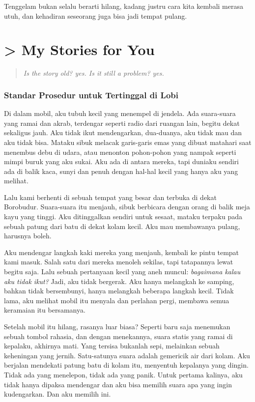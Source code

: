 \documentclass[
  letterpaper,
  DIV=11,
  numbers=noendperiod]{scrreprt}
\begin{document}
Tenggelam bukan selalu berarti hilang, kadang justru cara kita kembali
merasa utuh, dan kehadiran seseorang juga bisa jadi tempat pulang.


\chapter{\textgreater{} My Stories for You}\label{my-stories-for-you}

\begin{quote}
\emph{Is the story old? yes. Is it still a problem? yes.}
\end{quote}

\subsection{\texorpdfstring{\textbf{Standar Prosedur untuk Tertinggal di
Lobi}}{Standar Prosedur untuk Tertinggal di Lobi}}\label{standar-prosedur-untuk-tertinggal-di-lobi}

Di dalam mobil, aku tubuh kecil yang menempel di jendela. Ada
suara-suara yang ramai dan akrab, terdengar seperti radio dari ruangan
lain, begitu dekat sekaligus jauh. Aku tidak ikut mendengarkan,
dua-duanya, aku tidak mau dan aku tidak bisa. Mataku sibuk melacak
garis-garis emas yang dibuat matahari saat menembus debu di udara, atau
menonton pohon-pohon yang nampak seperti mimpi buruk yang aku sukai. Aku
ada di antara mereka, tapi duniaku sendiri ada di balik kaca, sunyi dan
penuh dengan hal-hal kecil yang hanya aku yang melihat.

Lalu kami berhenti di sebuah tempat yang besar dan terbuka di dekat
Borobudur. Suara-suara itu menjauh, sibuk berbicara dengan orang di
balik meja kayu yang tinggi. Aku ditinggalkan sendiri untuk sesaat,
mataku terpaku pada sebuah patung dari batu di dekat kolam kecil. Aku
mau membawanya pulang, harusnya boleh.

Aku mendengar langkah kaki mereka yang menjauh, kembali ke pintu tempat
kami masuk. Salah satu dari mereka menoleh sekilas, tapi tatapannya
lewat begitu saja. Lalu sebuah pertanyaan kecil yang aneh muncul:
\emph{bagaimana kalau aku tidak ikut?} Jadi, aku tidak bergerak. Aku
hanya melangkah ke samping, bahkan tidak bersembunyi, hanya melangkah
beberapa langkah kecil. Tidak lama, aku melihat mobil itu menyala dan
perlahan pergi, membawa semua keramaian itu bersamanya.

Setelah mobil itu hilang, rasanya luar biasa? Seperti baru saja
menemukan sebuah tombol rahasia, dan dengan menekannya, suara statis
yang ramai di kepalaku, akhirnya mati. Yang tersisa bukanlah sepi,
melainkan sebuah keheningan yang jernih. Satu-satunya suara adalah
gemericik air dari kolam. Aku berjalan mendekati patung batu di kolam
itu, menyentuh kepalanya yang dingin. Tidak ada yang menelepon, tidak
ada yang panik. Untuk pertama kalinya, aku tidak hanya dipaksa mendengar
dan aku bisa memilih suara apa yang ingin kudengarkan. Dan aku memilih
ini.
\end{document}
